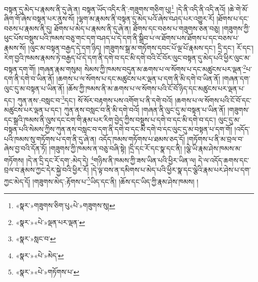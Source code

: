 བསྟན་དུ་མེད་པ་རྣམས་ནི་དུ་ཞེ་ན། བསྟན་ཡོད་འདིར་ནི་:གཟུགས་གཅིག་པུ།\footnote{«སྣར་»གཟུགས་ཅིག་པུ«པེ་»གཟུགས་སུ།} །དེ་ནི་འདི་ནི་འདི་ནའོ། །ཆེ་གེ་མོ་ཞིག་གོ་ཞེས་བསྟན་པར་ནུས་སོ། །ལྷག་མ་རྣམས་ནི་བསྟན་དུ་མེད་པའོ་ཞེས་བཤད་པར་འགྱུར་རོ། །ཐོགས་པ་དང་བཅས་པ་རྣམས་ནི་དུ། ཐོགས་པ་མེད་པ་རྣམས་ནི་དུ་ཞེ་ན། ཐོགས་དང་བཅས་པ་གཟུགས་ཅན་བཅུ། །གཟུགས་ཀྱི་ཕུང་པོས་བསྡུས་པའི་ཁམས་བཅུ་གང་དག་བཤད་པ་དེ་དག་ནི་སྒྲིབ་པ་ལ་ཐོགས་པས་ཐོགས་པ་དང་བཅས་པ་རྣམས་སོ། །ལུང་མ་བསྟན་བརྒྱད་དེ་དག་ཉིད། །གཟུགས་སྒྲ་མ་གཏོགས་དབང་པོ་ལྔ་པོ་རྣམས་དང་། དྲི་དང་། རོ་དང་། རེག་བྱའི་ཁམས་རྣམས་ཏེ་བརྒྱད་པོ་དེ་དག་ནི་དགེ་བ་དང་མི་དགེ་བའི་ངོ་བོར་ལུང་བསྟན་དུ་མེད་པའི་ཕྱིར་ལུང་མ་བསྟན་དག་གོ། །གཞན་རྣམ་གསུམ། སེམས་ཀྱི་ཁམས་བདུན་མ་ཆགས་པ་ལ་སོགས་པ་དང་མཚུངས་པར་ལྡན་\footnote{«སྣར་»«པེ་»ལྡན་པར་ལྡན་}པ་དག་ནི་དགེ་བ་ཡིན་ནོ། །ཆགས་པ་ལ་སོགས་པ་དང་མཚུངས་པར་ལྡན་པ་དག་ནི་མི་དགེ་བ་ཡིན་ནོ། །གཞན་དག་ལུང་དུ་མ་བསྟན་པ་ཡིན་ནོ། །ཆོས་ཀྱི་ཁམས་ནི་མ་ཆགས་པ་ལ་སོགས་པའི་ངོ་བོ་ཉིད་དང་མཚུངས་པར་ལྡན་པ་དང་། ཀུན་ནས་:བསླང་བ་\footnote{«སྣར་»སླང་བ་}དང་། སོ་སོར་བརྟགས་པས་འགོག་པ་ནི་དགེ་བའོ། །ཆགས་པ་ལ་སོགས་པའི་ངོ་བོ་དང་མཚུངས་པར་ལྡན་པ་དང་། ཀུན་ནས་བསླང་བ་ནི་མི་དགེ་བའོ། །གཞན་ནི་ལུང་དུ་མ་བསྟན་པ་ཡིན་ནོ། །གཟུགས་དང་སྒྲའི་ཁམས་ནི་ལུས་དང་ངག་གི་རྣམ་པར་རིག་བྱེད་ཀྱིས་བསྡུས་པ་དགེ་བ་དང་མི་དགེ་བ་དང་། ལུང་དུ་མ་བསྟན་པའི་སེམས་ཀྱིས་ཀུན་ནས་བསླང་བ་དག་ནི་དགེ་བ་དང་མི་དགེ་བ་དང་ལུང་དུ་མ་བསྟན་པ་དག་གོ། །འདོད་པའི་ཁམས་སུ་གཏོགས་པ་དག་ནི་དུ་ཞེ་ན། འདོད་ཁམས་གཏོགས་པ་ཐམས་ཅད་དོ། །གཏོགས་པ་ནི་མ་བྲལ་བ་ཞེས་བྱ་བའི་དོན་ཏོ། །གཟུགས་ཀྱི་ཁམས་ན་བཅུ་བཞི་སྟེ། །དྲི་དང་རོ་དང་སྣ་དང་ནི། །ལྕེ་ཡི་རྣམ་ཤེས་ཁམས་མ་གཏོགས། །དེ་ན་དྲི་དང་རོ་དག་:མེད་དེ། \footnote{«སྣར་»«པེ་»མེད་}གཉིས་ནི་ཁམས་ཀྱི་ཟས་ཡིན་པའི་ཕྱིར་ཡིན་ལ། དེ་ལ་འདོད་ཆགས་དང་བྲལ་བ་རྣམས་ཀྱང་དེར་སྐྱེ་བའི་ཕྱིར་རོ། །དེ་ལྟ་བས་ན་དམིགས་པ་མེད་པའི་ཕྱིར་སྣ་དང་ལྕེའི་རྣམ་པར་ཤེས་པ་དག་ཀྱང་མེད་དོ། །གཟུགས་མེད་:རྟོགས་པ་\footnote{«སྣར་»«པེ་»གཏོགས་པ་}ཡིད་དང་ནི། །ཆོས་དང་ཡིད་ཀྱི་རྣམ་ཤེས་ཁམས། །
